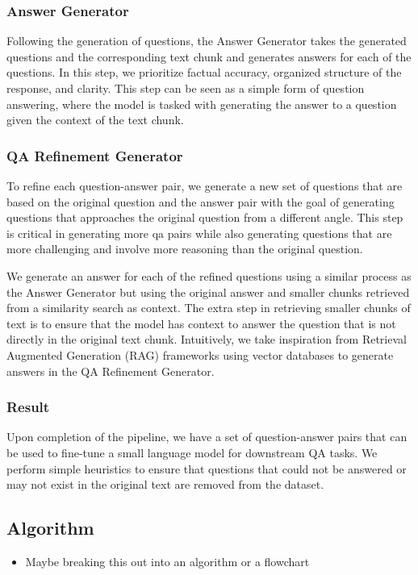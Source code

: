 \subsubsection{Answer Generator}

Following the generation of questions, the Answer Generator takes the generated questions and the corresponding text chunk and generates answers for each of the questions.
In this step, we prioritize factual accuracy, organized structure of the response, and clarity. This step can be seen as a simple form of question answering, where the model is
tasked with generating the answer to a question given the context of the text chunk.

\subsubsection{QA Refinement Generator}

To refine each question-answer pair, we generate a new set of questions that are based on the original question and the answer pair
with the goal of generating questions that approaches the original question from a different angle. This step is critical in
generating more qa pairs while also generating questions that are more challenging and involve more reasoning than the original question.

We generate an answer for each of the refined questions using a similar process as the Answer Generator but using the original answer
and smaller chunks retrieved from a similarity search as context. The extra step in retrieving smaller chunks of text is to ensure that the model
has context to answer the question that is not directly in the original text chunk. Intuitively, we take inspiration from Retrieval Augmented Generation
(RAG) frameworks using vector databases to generate answers in the QA Refinement Generator.

\subsubsection{Result}

Upon completion of the pipeline, we have a set of question-answer pairs that can be used to fine-tune a small language model for downstream QA tasks.
We perform simple heuristics to ensure that questions that could not be answered or may not exist in the original text are removed from the dataset.

\subsection{Algorithm}
\begin{itemize}
  \item Maybe breaking this out into an algorithm or a flowchart
\end{itemize}


